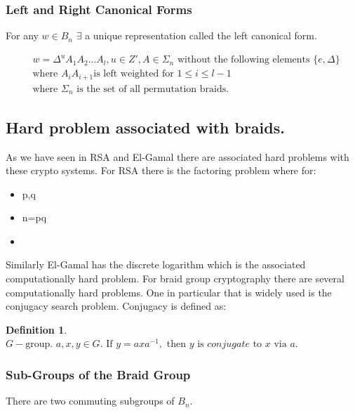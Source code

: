 \documentclass{article}
\theoremstyle{definition}
\newtheorem{definition}{Definition}[section]
\begin{document}
	
	
	
	\subsubsection{Left and Right Canonical Forms}
	
	For any $w \in B_n$ $\exists$ a unique representation called the left canonical form.
	
	\begin{align*}
		&w = \Delta^u A_1 A_2 ... A_l, u \in Z', A \in \Sigma_n \text{ without the following elements } \{ e, \Delta \} \\
		&\text{where } A_i A_{i+1} \text{is left weighted for } 1 \leq i \leq l - 1 \\
		&\text{where } \Sigma_n \text{ is the set of all permutation braids.}
	\end{align*}
	
	\subsection{Hard problem associated with braids.}
	As we have seen in RSA and El-Gamal there are associated hard problems with these crypto systems. For RSA there is the factoring problem where for:
	
	\begin{itemize}
		\item p,q 
		\item n=pq 
		\item {} 
	\end{itemize}

Similarly El-Gamal has the discrete logarithm which is the associated computationally hard problem. 
For braid group cryptography there are several computationally hard problems. One in particular that is widely used is the conjugacy search problem. Conjugacy is defined as:
\begin{definition} 
$G-\text{group. } a,x,y \in G. \text{ If }y=axa^{-1},\text{ then }y \text{ is } conjugate \text{ to }x \text{ via }a.$

\end{definition}

	
	
	
	\subsubsection{Sub-Groups of the Braid Group}
	There are two commuting subgroups of $B_n$.
	
\end{document}
